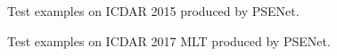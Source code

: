\documentclass[10pt,twocolumn,letterpaper]{article}
\begin{document}
	\begin{figure}[b]
		\centering
		\setlength{\fboxrule}{0pt}
		\caption{Test examples on ICDAR 2015 produced by PSENet.}
		\label{fig:ic15}
	\end{figure}
	
	\begin{figure}[b]
		\centering
		\setlength{\fboxrule}{0pt}
		\caption{Test examples on ICDAR 2017 MLT produced by PSENet.}
		\label{fig:ic17}
	\end{figure}

{\small


}
\end{document}

